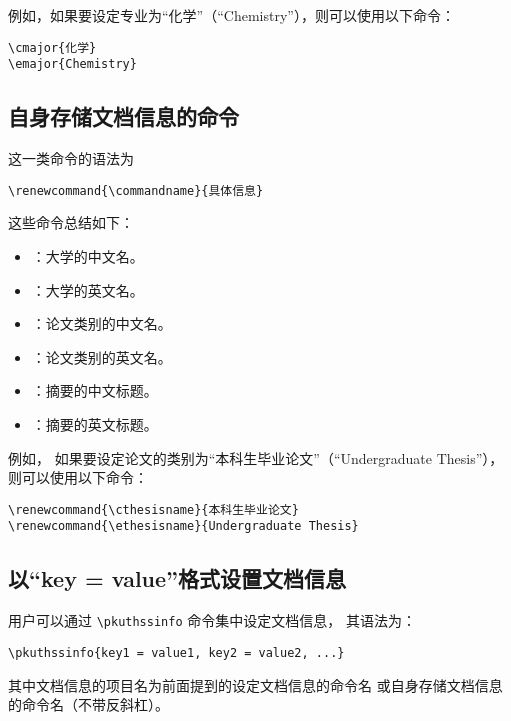 		例如，如果要设定专业为“化学”（“Chemistry”），则可以使用以下命令：
\begin{Verbatim}[frame = single]
\cmajor{化学}
\emajor{Chemistry}
\end{Verbatim}

		\subsection{自身存储文档信息的命令}

		这一类命令的语法为
\begin{Verbatim}[frame = single]
% commandname 为具体的命令名。
\renewcommand{\commandname}{具体信息}
\end{Verbatim}

		这些命令总结如下：
		\begin{itemize}
			\item \texttt{\bfseries\string\cuniversity}：大学的中文名。
			\item \texttt{\bfseries\string\euniversity}：大学的英文名。
			\item \texttt{\bfseries\string\cthesisname}：论文类别的中文名。
			\item \texttt{\bfseries\string\ethesisname}：论文类别的英文名。
			\item \texttt{\bfseries\string\cabstractname}：摘要的中文标题。
			\item \texttt{\bfseries\string\eabstractname}：摘要的英文标题。
		\end{itemize}

		例如，
		如果要设定论文的类别为“本科生毕业论文”（“Undergraduate Thesis”），
		则可以使用以下命令：
\begin{Verbatim}[frame = single]
\renewcommand{\cthesisname}{本科生毕业论文}
\renewcommand{\ethesisname}{Undergraduate Thesis}
\end{Verbatim}

		\subsection{以“key = value”格式设置文档信息}

		用户可以通过 \verb|\pkuthssinfo| 命令集中设定文档信息，
		其语法为：
\begin{Verbatim}[frame = single]
% key1、key2、value1、value2 等为具体文档信息的项目名和内容。
\pkuthssinfo{key1 = value1, key2 = value2, ...}
\end{Verbatim}
		其中文档信息的项目名为前面提到的设定文档信息的命令名%
		或自身存储文档信息的命令名（不带反斜杠）。

